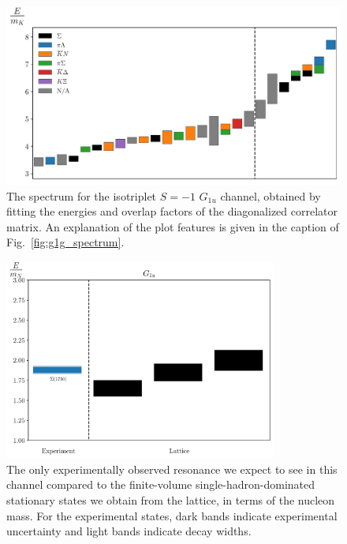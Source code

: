\begin{figure}[H]
    \centering
    \hspace*{-0.5in}\includegraphics[width=\textwidth]{figures/sigmas/g1u/staircase_mk.pdf}
    \caption[The spectrum for the isotriplet $S=-1$ $G_{1u}$ channel, obtained by fitting the energies and overlap factors of the diagonalized correlator matrix.]{The spectrum for the isotriplet $S=-1$ $G_{1u}$ channel, obtained by fitting the energies and overlap factors of the diagonalized correlator matrix. An explanation of the plot features is given in the caption of Fig.~\ref{fig:g1g_spectrum}.}\label{fig:g1u_spectrum}
\end{figure}

\begin{figure}[H]
    \centering
    \includegraphics[width=0.8\textwidth]{figures/sigmas/g1u/expvslat.pdf}
    \caption[The only experimentally observed resonance we expect to see in $G_{1u}$ compared to the finite-volume single-hadron-dominated stationary states we obtain from the lattice, in terms of the nucleon mass.]{The only experimentally observed resonance we expect to see in this channel compared to the finite-volume single-hadron-dominated stationary states we obtain from the lattice, in terms of the nucleon mass. For the experimental states, dark bands indicate experimental uncertainty and light bands indicate decay widths.}\label{fig:g1u_exp}
\end{figure}

